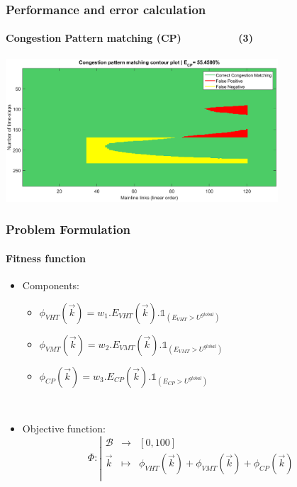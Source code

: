 \documentclass[fleqn]{beamer}
\begin{document}
\begin{frame}
	\centering
	\frametitle{Performance and error calculation}
	\framesubtitle{Congestion Pattern matching (CP)~~~~~~~~~~(3)}
	\includegraphics[width=4in]{figures/cp_example.png}
\end{frame}



\begin{frame}
	\frametitle{Problem Formulation}
	\framesubtitle{Fitness function}
	\begin{itemize}
		\item Components: 
		\begin{itemize}
			\item $\phi_{VHT}(\vec{k})=w_{1}.E_{VHT}(\vec{k}).\mathds{1}_{(E_{VHT}>U^{global})}$\\
			\item $\phi_{VMT}(\vec{k})=w_{2}.E_{VMT}(\vec{k}).\mathds{1}_{(E_{VMT}>U^{global})}$\\
			\item $\phi_{CP}(\vec{k})=w_{3}.E_{CP}(\vec{k}).\mathds{1}_{(E_{CP}>U^{global})}$\\	
		\end{itemize}
		~\\
		\item Objective function: 
		\begin{equation*}
			\Phi:
			\left|
	  		\begin{array}{rcl}
		    	\mathscr{B} & \longrightarrow &[0,100] \\
		    	\vec{k} & \longmapsto &  \phi_{VHT}(\vec{k})+\phi_{VMT}(\vec{k})+\phi_{CP}(\vec{k}) \\
		  	\end{array}
			\right.
		\end{equation*}
	\end{itemize}			
\end{frame}
\end{document}
